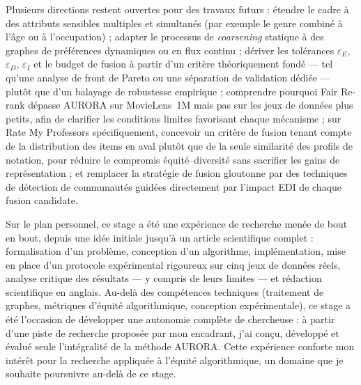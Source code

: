 \documentclass[12pt]{report}
\begin{document}
Plusieurs directions restent ouvertes pour des travaux futurs :
étendre le cadre à des attributs sensibles multiples et simultanés (par
exemple le genre combiné à l'âge ou à l'occupation) ; adapter le
processus de \emph{coarsening} statique à des graphes de préférences
dynamiques ou en flux continu ; dériver les tolérances $\varepsilon_E$,
$\varepsilon_D$, $\varepsilon_I$ et le budget de fusion à partir d'un
critère théoriquement fondé --- tel qu'une analyse de front de Pareto ou une
séparation de validation dédiée --- plutôt que d'un balayage de
robustesse empirique ; comprendre pourquoi Fair Re-rank dépasse AURORA
sur MovieLens~1M mais pas sur les jeux de données plus petits, afin de
clarifier les conditions limites favorisant chaque mécanisme ; sur Rate
My Professors spécifiquement, concevoir un critère de fusion tenant
compte de la distribution des items en aval plutôt que de la seule
similarité des profils de notation, pour réduire le compromis
équité--diversité sans sacrifier les gains de représentation ; et
remplacer la stratégie de fusion gloutonne par des techniques de
détection de communautés guidées directement par l'impact EDI de chaque
fusion candidate.


Sur le plan personnel, ce stage a été une expérience de recherche menée
de bout en bout, depuis une idée initiale jusqu'à un article scientifique
complet : formalisation d'un problème, conception d'un algorithme,
implémentation, mise en place d'un protocole expérimental rigoureux sur
cinq jeux de données réels, analyse critique des résultats --- y compris
de leurs limites --- et rédaction scientifique en anglais. Au-delà des
compétences techniques (traitement de graphes, métriques d'équité
algorithmique, conception expérimentale), ce stage a été l'occasion de
développer une autonomie complète de chercheuse : à partir d'une piste de
recherche proposée par mon encadrant, j'ai conçu, développé et évalué
seule l'intégralité de la méthode AURORA. Cette expérience conforte mon
intérêt pour la recherche appliquée à l'équité algorithmique, un domaine
que je souhaite poursuivre au-delà de ce stage.
\end{document}
